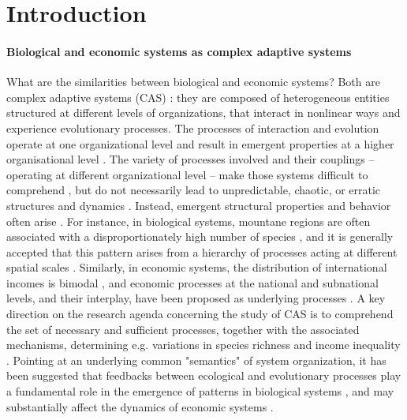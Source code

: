 %
\chapter{Introduction}



\label{sec:intro}


\subsubsection*{Biological and economic systems as complex adaptive systems}
What are the similarities between biological and economic systems? Both are complex adaptive systems (CAS) \cite{Levin2002}: they are composed of heterogeneous entities structured at different levels of organizations, that interact in nonlinear ways and experience evolutionary processes. The processes of interaction and evolution operate at one organizational level and result in emergent properties at a higher organisational level \cite{Levin1998}. The variety of processes involved and their couplings -- operating at different organizational level -- make those systems difficult to comprehend \cite{Strogatz2001a}, but do not necessarily lead to unpredictable, chaotic, or erratic structures and dynamics \cite{Olff2009}. Instead, emergent structural properties and behavior often arise \cite{mitchell2009complexity}.
% 
For instance, in biological systems, mountane regions are often associated with a disproportionately high number of species \cite{Rahbek2019}, and it is generally accepted that this pattern arises from a hierarchy of processes acting at different spatial scales \cite{Rangel2018,Rahbek2019a}.
% 
Similarly, in economic systems, the distribution of international incomes is bimodal \cite{acemoglu2001colonial}, and economic processes at the national and subnational levels, and their interplay, have been proposed as underlying processes \cite{Hidalgo2021,C.A.HidalgoB.Klinger}. 
% 
A key direction on the research agenda concerning the study of CAS is to comprehend the set of necessary and sufficient processes, together with the associated mechanisms, determining e.g. variations in species richness and income inequality \cite{Vellend2010a}.
% 
Pointing at an underlying common "semantics" of system organization, it has been suggested that feedbacks between ecological and evolutionary processes play a fundamental role in the emergence of patterns in biological systems \cite{Pelletier2009}, and may substantially affect the dynamics of economic systems \cite{Hodgson2019}.

